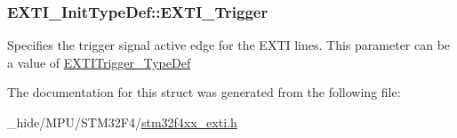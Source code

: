 \subsubsection[{E\+X\+T\+I\+\_\+\+Trigger}]{ E\+X\+T\+I\+\_\+\+Init\+Type\+Def\+::\+E\+X\+T\+I\+\_\+\+Trigger}\label{struct_e_x_t_i___init_type_def_ab0bd8417e78fe2b43eed79e44064510c}
Specifies the trigger signal active edge for the E\+X\+T\+I lines. This parameter can be a value of \hyperlink{group___e_x_t_i_ga9da190f5425d1b421a06bced8cc48e9b}{E\+X\+T\+I\+Trigger\+\_\+\+Type\+Def} 

The documentation for this struct was generated from the following file\+:\begin{DoxyCompactItemize}
\item 
\+\_\+hide/\+M\+P\+U/\+S\+T\+M32\+F4/\hyperlink{stm32f4xx__exti_8h}{stm32f4xx\+\_\+exti.\+h}\end{DoxyCompactItemize}

